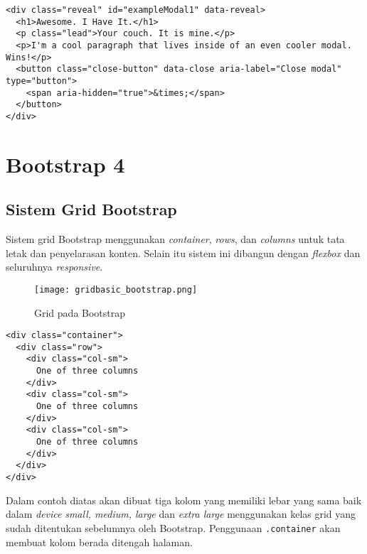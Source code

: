 {\begin{lstlisting}[frame=single, basicstyle=\tiny] 
<div class="reveal" id="exampleModal1" data-reveal>
  <h1>Awesome. I Have It.</h1>
  <p class="lead">Your couch. It is mine.</p>
  <p>I'm a cool paragraph that lives inside of an even cooler modal. Wins!</p>
  <button class="close-button" data-close aria-label="Close modal" type="button">
    <span aria-hidden="true">&times;</span>
  </button>
</div>
\end{lstlisting} 

\section{Bootstrap 4}
\subsection{Sistem Grid Bootstrap}
Sistem grid Bootstrap menggunakan \textit{container}, \textit{rows}, dan \textit{columns} untuk tata letak dan penyelarasan konten. Selain itu sistem ini dibangun dengan \textit{flexbox} dan seluruhnya \textit{responsive}. \cite{bootstrap:19}
\begin{figure} [H]
	\centering  
	\texttt{[image: gridbasic\_bootstrap.png]}  
	\caption{Grid pada Bootstrap} 
\end{figure}

\begin{lstlisting}[frame=single] 
<div class="container">
  <div class="row">
    <div class="col-sm">
      One of three columns
    </div>
    <div class="col-sm">
      One of three columns
    </div>
    <div class="col-sm">
      One of three columns
    </div>
  </div>
</div>
\end{lstlisting}
Dalam contoh diatas akan dibuat tiga kolom yang memiliki lebar yang sama baik dalam \textit{device} \textit{small, medium, large} dan \textit{extra large} menggunakan kelas grid yang sudah ditentukan sebelumnya oleh Bootstrap. Penggunaan \verb|.container| akan membuat kolom berada ditengah halaman.

}
